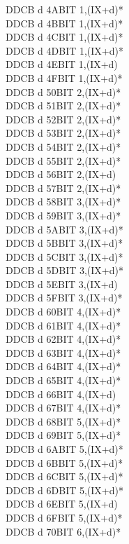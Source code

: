 \documentclass[oneside,a4paper]{book}
\begin{document}
\begin{multicols}{3}
{\begin{tabbing}
DDCB d 4A\>BIT 1,(IX+d)*\\
DDCB d 4B\>BIT 1,(IX+d)*\\
DDCB d 4C\>BIT 1,(IX+d)*\\
DDCB d 4D\>BIT 1,(IX+d)*\\
DDCB d 4E\>BIT 1,(IX+d)\\
DDCB d 4F\>BIT 1,(IX+d)*\\
DDCB d 50\>BIT 2,(IX+d)*\\
DDCB d 51\>BIT 2,(IX+d)*\\
DDCB d 52\>BIT 2,(IX+d)*\\
DDCB d 53\>BIT 2,(IX+d)*\\
DDCB d 54\>BIT 2,(IX+d)*\\
DDCB d 55\>BIT 2,(IX+d)*\\
DDCB d 56\>BIT 2,(IX+d)\\
DDCB d 57\>BIT 2,(IX+d)*\\
DDCB d 58\>BIT 3,(IX+d)*\\
DDCB d 59\>BIT 3,(IX+d)*\\
DDCB d 5A\>BIT 3,(IX+d)*\\
DDCB d 5B\>BIT 3,(IX+d)*\\
DDCB d 5C\>BIT 3,(IX+d)*\\
DDCB d 5D\>BIT 3,(IX+d)*\\
DDCB d 5E\>BIT 3,(IX+d)\\
DDCB d 5F\>BIT 3,(IX+d)*\\
DDCB d 60\>BIT 4,(IX+d)*\\
DDCB d 61\>BIT 4,(IX+d)*\\
DDCB d 62\>BIT 4,(IX+d)*\\
DDCB d 63\>BIT 4,(IX+d)*\\
DDCB d 64\>BIT 4,(IX+d)*\\
DDCB d 65\>BIT 4,(IX+d)*\\
DDCB d 66\>BIT 4,(IX+d)\\
DDCB d 67\>BIT 4,(IX+d)*\\
DDCB d 68\>BIT 5,(IX+d)*\\
DDCB d 69\>BIT 5,(IX+d)*\\
DDCB d 6A\>BIT 5,(IX+d)*\\
DDCB d 6B\>BIT 5,(IX+d)*\\
DDCB d 6C\>BIT 5,(IX+d)*\\
DDCB d 6D\>BIT 5,(IX+d)*\\
DDCB d 6E\>BIT 5,(IX+d)\\
DDCB d 6F\>BIT 5,(IX+d)*\\
DDCB d 70\>BIT 6,(IX+d)*\\

\end{tabbing}}
\end{multicols}
\end{document}
